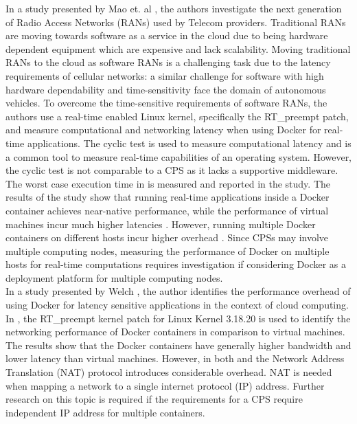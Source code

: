 In a study presented by Mao et. al \cite{p1}, the authors investigate the next generation of Radio Access Networks (RANs) used by Telecom providers. Traditional RANs are moving towards software as a service in the cloud \cite{p1} due to being hardware dependent equipment which are expensive and lack scalability. Moving traditional RANs to the cloud as software RANs is a challenging task due to the latency requirements of cellular networks: a similar challenge for software with high hardware dependability and time-sensitivity face the domain of autonomous vehicles. To overcome the time-sensitive requirements of software RANs, the authors use a real-time enabled Linux kernel, specifically the RT\_preempt patch, and measure computational and networking latency when using Docker for real-time applications. The cyclic test \cite{cycl} is used to measure computational latency and is a common tool to measure real-time capabilities of an operating system. However, the cyclic test is not comparable to a CPS as it lacks a supportive middleware. The worst case execution time in \cite{p1} is measured and reported in the study. The results of the study show that running real-time applications inside a Docker container achieves near-native performance, while the performance of virtual machines incur much higher latencies \cite{p1}. However, running multiple Docker containers on different hosts incur higher overhead \cite{p1}. Since CPSs may involve multiple computing nodes, measuring the performance of Docker on multiple hosts for real-time computations requires investigation if considering Docker as a deployment platform for multiple computing nodes.  \\

In a study presented by Welch \cite{p10}, the author identifies the performance overhead of using Docker for latency sensitive applications in the context of cloud computing. In \cite{p10}, the RT\_preempt kernel patch for Linux Kernel 3.18.20 is used to identify the networking performance of Docker containers in comparison to virtual machines. The results show that the Docker containers have generally higher bandwidth and lower latency than virtual machines. However, in both \cite{p10} and \cite{p6} the Network Address Translation (NAT) protocol introduces considerable overhead. NAT is needed when mapping a network to a single internet protocol (IP) address. Further research on this topic is required if the requirements for a CPS require independent IP address for multiple containers. \\

